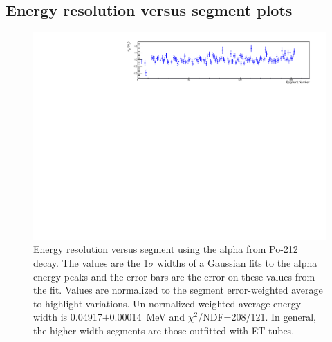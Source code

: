 \subsection{Energy resolution versus segment plots}
\begin{figure}[!h]
\centering
\includegraphics[width=1.05\textwidth]{figures/PubBiPo212EresvsCell.pdf}
\caption{\label{fig:EresvsCell212}Energy resolution versus segment using the alpha from Po-212 decay. The values are the 1$\sigma$ widths of a Gaussian fits to the alpha energy peaks and the error bars are the error on these values from the fit. Values are normalized to the segment error-weighted average to highlight variations. Un-normalized weighted average energy width is 0.04917$\pm$0.00014~MeV and $\chi^2$/NDF=208/121.  In general, the higher width segments are those outfitted with ET tubes.}
\end{figure}
